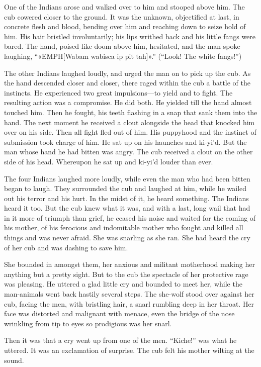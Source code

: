 \documentclass[10pt]{book}
\begin{document}
One of the Indians arose and walked over to him and stooped above him.
The cub cowered closer to the ground. It was the unknown, objectified
at last, in concrete flesh and blood, bending over him and reaching
down to seize hold of him. His hair bristled involuntarily; his lips
writhed back and his little fangs were bared. The hand, poised like
doom above him, hesitated, and the man spoke laughing, “«EMPH[Wabam wabisca
ip pit tah]».” (“Look! The white fangs!”)

The other Indians laughed loudly, and urged the man on to pick up the
cub. As the hand descended closer and closer, there raged within the
cub a battle of the instincts. He experienced two great impulsions—to
yield and to fight. The resulting action was a compromise. He did both.
He yielded till the hand almost touched him. Then he fought, his teeth
flashing in a snap that sank them into the hand. The next moment he
received a clout alongside the head that knocked him over on his side.
Then all fight fled out of him. His puppyhood and the instinct of
submission took charge of him. He sat up on his haunches and ki-yi’d.
But the man whose hand he had bitten was angry. The cub received a
clout on the other side of his head. Whereupon he sat up and ki-yi’d
louder than ever.

The four Indians laughed more loudly, while even the man who had been
bitten began to laugh. They surrounded the cub and laughed at him,
while he wailed out his terror and his hurt. In the midst of it, he
heard something. The Indians heard it too. But the cub knew what it
was, and with a last, long wail that had in it more of triumph than
grief, he ceased his noise and waited for the coming of his mother, of
his ferocious and indomitable mother who fought and killed all things
and was never afraid. She was snarling as she ran. She had heard the
cry of her cub and was dashing to save him.

She bounded in amongst them, her anxious and militant motherhood making
her anything but a pretty sight. But to the cub the spectacle of her
protective rage was pleasing. He uttered a glad little cry and bounded
to meet her, while the man-animals went back hastily several steps. The
she-wolf stood over against her cub, facing the men, with bristling
hair, a snarl rumbling deep in her throat. Her face was distorted and
malignant with menace, even the bridge of the nose wrinkling from tip
to eyes so prodigious was her snarl.

Then it was that a cry went up from one of the men. “Kiche!” was what
he uttered. It was an exclamation of surprise. The cub felt his mother
wilting at the sound.
\end{document}

